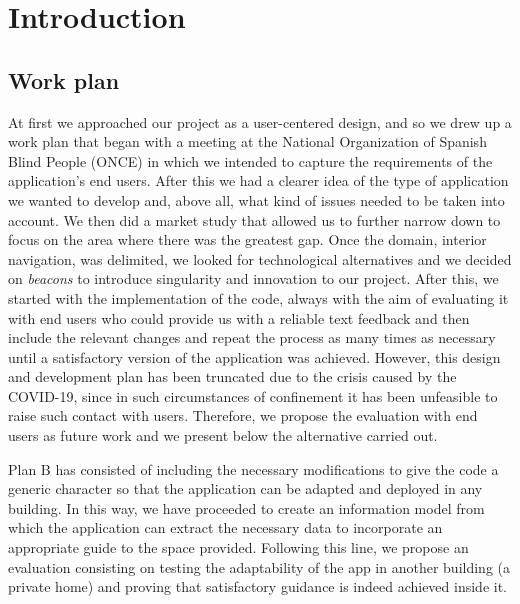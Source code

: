 \chapter{Introduction}
\label{cap:introduction}





\section{Work plan}
\label{sec:workPlan}


At first we approached our project as a user-centered design, and so we drew up a work plan that began with a meeting at the National Organization of Spanish Blind People (ONCE) in which we intended to capture the requirements of the application's end users. After this we had a clearer idea of the type of application we wanted to develop and, above all, what kind of issues needed to be taken into account. We then did a market study that allowed us to further narrow down to focus on the area where there was the greatest gap. Once the domain, interior navigation, was delimited, we looked for technological alternatives and we decided on \textit{beacons} to introduce singularity and innovation to our project. After this, we started with the implementation of the code, always with the aim of evaluating it with end users who could provide us with a reliable text feedback and then include the relevant changes and repeat the process as many times as necessary until a satisfactory version of the application was achieved. However, this design and development plan has been truncated due to the crisis caused by the COVID-19, since in such circumstances of confinement it has been unfeasible to raise such contact with users. Therefore, we propose the evaluation with end users as future work and we present below the alternative carried out.

Plan B has consisted of including the necessary modifications to give the code a generic character so that the application can be adapted and deployed in any building. In this way, we have proceeded to create an information model from which the application can extract the necessary data to incorporate an appropriate guide to the space provided. Following this line, we propose an evaluation consisting on testing the adaptability of the app in another building (a private home) and proving that satisfactory guidance is indeed achieved inside it.


